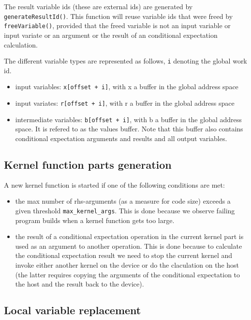 \documentclass[12pt, a4paper]{article}
\begin{document}
The result variable ids (these are external ids) are generated by \verb+generateResultId()+. This function will reuse
variable ids that were freed by \verb+freeVariable()+, provided that the freed variable is not an input variable or
input variate or an argument or the result of an conditional expectation calculation.

The different variable types are represented as follows, \verb+i+ denoting the global work id.

\begin{itemize}
\item input variables: {\tt x[offset + i]}, with x a buffer in the global address space
\item input variates: {\tt r[offset + i]}, with r a buffer in the global address space
\item intermediate variables: {\tt b[offset + i]}, with b a buffer in the global address space. It is refered to as the
  values buffer. Note that this buffer also contains conditional expectation arguments and results and all output
  variables.
\end{itemize}

\subsection{Kernel function parts generation}\label{kernelFunctionPartsGeneration}

A new kernel function is started if one of the following conditions are met:

\begin{itemize}
\item the max number of rhs-arguments (as a measure for code size) exceeds a given threshold
  \verb+max_kernel_args+. This is done because we observe failing program builds when a kernel function gets too large.
\item the result of a conditional expectation operation in the current kernel part is used as an argument to another
  operation. This is done because to calculate the conditional expectation result we need to stop the current kernel and
  invoke either another kernel on the device or do the claculation on the host (the latter requires copying the
  arguments of the conditional expectation to the host and the result back to the device).
\end{itemize}

\subsection{Local variable replacement}\label{localVariableReplacement}
\end{document}
